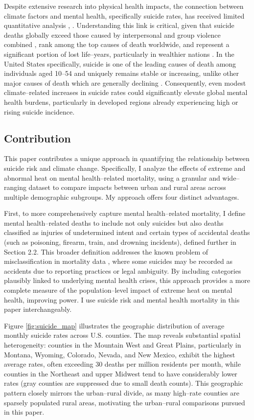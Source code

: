 \documentclass[12pt, a4paper]{article}
\begin{document}
Despite extensive research into physical health impacts, the connection between climate factors and mental health, specifically suicide rates, has received limited quantitative analysis \cite{Berry2010}, \cite{burke2018}. Understanding this link is critical, given that suicide deaths globally exceed those caused by interpersonal and group violence combined \cite{Lim2013}, rank among the top causes of death worldwide, and represent a significant portion of lost life--years, particularly in wealthier nations \cite{Lozano2013}. In the United States specifically, suicide is one of the leading causes of death among individuals aged 10--54 \cite{cdcWisqars} and uniquely remains stable or increasing, unlike other major causes of death which are generally declining \cite{Swanson2015}. Consequently, even modest climate--related increases in suicide rates could significantly elevate global mental health burdens, particularly in developed regions already experiencing high or rising suicide incidence.

\subsection{Contribution}
This paper contributes a unique approach in quantifying the relationship between suicide risk and climate change. Specifically, I analyze the effects of extreme and abnormal heat on mental health--related mortality, using a granular and wide--ranging dataset to compare impacts between urban and rural areas across multiple demographic subgroups. My approach offers four distinct advantages.

First, to more comprehensively capture mental health--related mortality, I define mental health--related deaths to include not only suicides but also deaths classified as injuries of undetermined intent and certain types of accidental deaths (such as poisoning, firearm, train, and drowning incidents), defined further in Section 2.2. This broader definition addresses the known problem of misclassification in mortality data \cite{MHClassification}, where some suicides may be recorded as accidents due to reporting practices or legal ambiguity. By including categories plausibly linked to underlying mental health crises, this approach provides a more complete measure of the population--level impact of extreme heat on mental health, improving power. I use suicide risk and mental health mortality in this paper interchangeably.

Figure \ref{fig:suicide_map} illustrates the geographic distribution of average monthly suicide rates across U.S. counties. The map reveals substantial spatial heterogeneity: counties in the Mountain West and Great Plains, particularly in Montana, Wyoming, Colorado, Nevada, and New Mexico, exhibit the highest average rates, often exceeding 30 deaths per million residents per month, while counties in the Northeast and upper Midwest tend to have considerably lower rates (gray counties are suppressed due to small death counts). This geographic pattern closely mirrors the urban--rural divide, as many high--rate counties are sparsely populated rural areas, motivating the urban--rural comparisons pursued in this paper.
\end{document}
